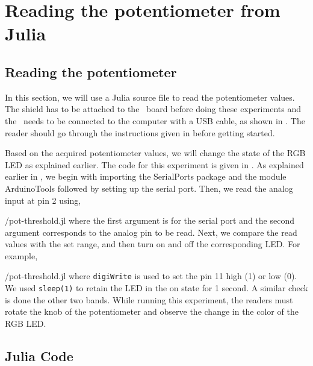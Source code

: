 \section{Reading the potentiometer from Julia}
\subsection{Reading the potentiometer}
In this section, we will use a Julia source file to read 
the potentiometer values. The shield has to be attached to the \arduino\ board
before doing these experiments and the \arduino\ needs to be 
connected to the computer with a USB cable, 
as shown in . The reader should go through the instructions given in 
 before getting started.


Based on the acquired potentiometer values, we will change the 
state of the RGB LED as explained earlier. 
The code for this experiment is given in
. As explained earlier in , we begin with importing the SerialPorts 
\cite{julia-serial-ports} package and the module ArduinoTools followed by setting up the serial port.
Then, we read the analog input at pin 2 using,

{\LocPotjuliacode/pot-threshold.jl} where the first argument is for
the serial port and the second argument corresponds to the analog pin 
to be read.  Next, we compare the read values with the set range, 
and then turn on and off the corresponding LED. For example, 

{\LocPotjuliacode/pot-threshold.jl} where {\tt digiWrite} 
is used to set the pin 11 high (1) or low (0). 
We used {\tt sleep(1)} to retain the LED in the on state for 1 second.  
A similar check is done the other two bands. 
While running this experiment, 
the readers must rotate the knob of the potentiometer and observe 
the change in the color of the RGB LED.
\subsection{Julia Code}
\label{sec:pot-julia-code}
\begin{juliacode}
\label{julia:pot-100}

\end{juliacode}

